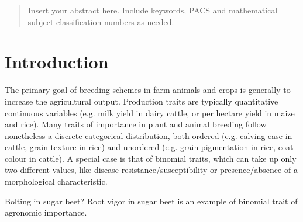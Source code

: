 

\date{Received: 05 August 2014 / Accepted:}

\maketitle

\begin{abstract}
Insert your abstract here. Include keywords, PACS and mathematical
subject classification numbers as needed.
\end{abstract}

\section{Introduction}
\label{intro}
The primary goal of breeding schemes in farm animals and crops is
generally to increase the agricultural output. Production traits are
typically quantitative continuous variables (e.g. milk
yield in dairy cattle, or per hectare yield in maize and rice).
Many traits of importance in plant and animal breeding follow nonetheless
a discrete categorical distribution, both ordered (e.g. calving ease in
cattle, grain texture in rice) and unordered
(e.g. grain pigmentation in rice, coat colour in cattle). A special case
is that of binomial traits, which can take up only two different values,
like disease resistance/susceptibility or presence/absence of a
morphological characteristic. 

Bolting in sugar beet?
Root vigor in sugar beet is an example of binomial trait of agronomic
importance. 

